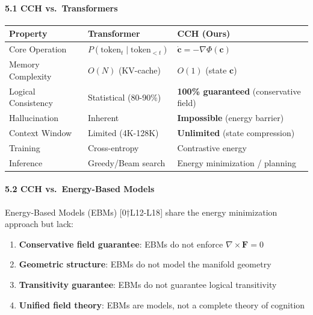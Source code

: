 \documentclass[
  11pt,
  a4paper,
]{article}
\providecommand{\tightlist}{%
  \setlength{\itemsep}{0pt}\setlength{\parskip}{0pt}}
\begin{document}
\paragraph{5.1 CCH vs.~Transformers}\label{cch-vs.-transformers}

\begin{longtable}[]{@{}
  >{\raggedright\arraybackslash}p{}
  >{\raggedright\arraybackslash}p{}
  >{\raggedright\arraybackslash}p{}@{}}
\toprule\noalign{}
\begin{minipage}[b]{\linewidth}\raggedright
Property
\end{minipage} & \begin{minipage}[b]{\linewidth}\raggedright
Transformer
\end{minipage} & \begin{minipage}[b]{\linewidth}\raggedright
CCH (Ours)
\end{minipage} \\
\midrule\noalign{}
\endhead
\bottomrule\noalign{}
\endlastfoot
Core Operation & \(P(\text{token}_t \mid \text{token}_{<t})\) &
\(\dot{\mathbf{c}} = -\nabla \Phi(\mathbf{c})\) \\
Memory Complexity & \(O(N)\) (KV-cache) & \(O(1)\) (state
\(\mathbf{c}\)) \\
Logical Consistency & Statistical (80-90\%) & \textbf{100\% guaranteed}
(conservative field) \\
Hallucination & Inherent & \textbf{Impossible} (energy barrier) \\
Context Window & Limited (4K-128K) & \textbf{Unlimited} (state
compression) \\
Training & Cross-entropy & Contrastive energy \\
Inference & Greedy/Beam search & Energy minimization / planning \\
\end{longtable}

\paragraph{5.2 CCH vs.~Energy-Based
Models}\label{cch-vs.-energy-based-models}

Energy-Based Models (EBMs) {[}0†L12-L18{]} share the energy minimization
approach but lack:

\begin{enumerate}
\def\labelenumi{\arabic{enumi}.}
\tightlist
\item
  \textbf{Conservative field guarantee}: EBMs do not enforce
  \(\nabla \times \mathbf{F} = 0\)
\item
  \textbf{Geometric structure}: EBMs do not model the manifold geometry
\item
  \textbf{Transitivity guarantee}: EBMs do not guarantee logical
  transitivity
\item
  \textbf{Unified field theory}: EBMs are models, not a complete theory
  of cognition
\end{enumerate}
\end{document}
